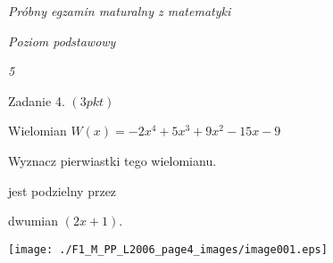 \documentclass[a4paper,12pt]{article}
\begin{document}
{\it Próbny egzamin maturalny z matematyki}

{\it Poziom podstawowy}

{\it 5}

Zadanie 4. $(3pkt)$

Wielomian $W(x)=-2x^{4}+5x^{3}+9x^{2}-15x-9$

Wyznacz pierwiastki tego wielomianu.

jest podzielny przez

dwumian $(2x+1).$
\begin{center}
\texttt{[image: ./F1\_M\_PP\_L2006\_page4\_images/image001.eps]}
\end{center}
\end{document}
